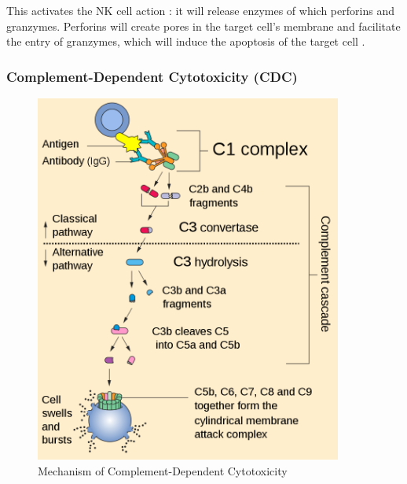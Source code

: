 This activates the NK cell action : it will release enzymes of which perforins
and granzymes. Perforins will create pores in the target cell's membrane and 
facilitate the entry of granzymes, which will induce the apoptosis
of the target cell \cite{paul_molecular_2017}.

\subsubsection{Complement-Dependent Cytotoxicity (CDC)}

\begin{figure}[H]
    \begin{minipage}{0.49\textwidth}
        \centering
        \includegraphics[width=0.9\textwidth]{../Images/Complement_pathway.svg.png}
        \caption{Mechanism of Complement-Dependent Cytotoxicity}
        \label{fig:CDC_pathway}
    \end{minipage}\hfill
    \begin{minipage}{0.49\textwidth}
        \centering

\end{minipage}
\end{figure}
